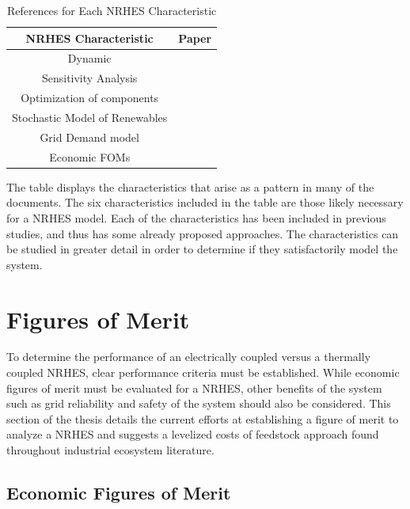 \documentclass[12pt]{UIdahoMastersThesis}
\begin{document}
\begin{table}[h!]
\centering
\caption{References for Each NRHES Characteristic}
\begin{tabular}{ ||c | c|| }
 \hline
 NRHES Characteristic & Paper \\ [0.5ex]
 \hline \hline
 Dynamic & \cite{Garcia2013, Du2014, Kazimi, Garcia2016}\\
 \hline
 Sensitivity Analysis & \cite{Shropshire2011, Rehman2010, Adaramola2014, Chen2016}\\
 \hline
 Optimization of components & \cite{Chen2016,Ozcan2016, Forsberg2009,Garcia2015,Aumeier2011}\\
 \hline
 Stochastic Model of Renewables & \cite{Rabiti2015, Garcia2016,Locatelli2015}\\
 \hline
 Grid Demand model & \cite{Forsberg2013, Garcia2016,Garcia2013,Ruth2014,Chen2016}\\
 \hline
  Economic FOMs & \cite{Garcia2016,Chen2016,Rabiti2015,Epiney2016,Bragg-Sitton2014}\\
 \hline
\end{tabular}
\label{table:1}
\end{table}

The table displays the characteristics that arise as a pattern in many of the documents.  The six characteristics included in the table are those likely necessary for a NRHES model.  Each of the characteristics has been included in previous studies, and thus has some already proposed approaches.  The characteristics can be studied in greater detail in order to determine if they satisfactorily model the system.

\chapter{Figures of Merit}
To determine the performance of an electrically coupled versus a thermally coupled NRHES, clear performance criteria must be established.  While economic figures of merit must be evaluated for a NRHES, other benefits of the system such as grid reliability and safety of the system should also be considered. This section of the thesis details the current efforts at establishing a figure of merit to analyze a NRHES and suggests a levelized costs of feedstock approach found throughout industrial ecosystem literature.
\section{Economic Figures of Merit}
\end{document}
